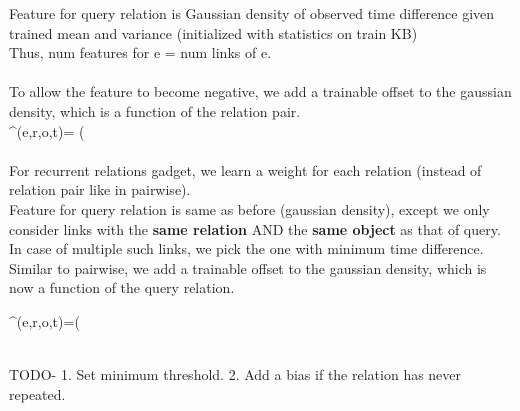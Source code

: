 \documentclass[12pt,a4paper]{article}
\begin{document}
Feature for query relation   is Gaussian density of observed time difference  given trained mean  and variance  (initialized with statistics on train KB)\\
Thus, num features for e = num links of e.\\\\
To allow the feature to become negative, we add a trainable offset to the gaussian density, which is a function of the relation pair.\\
\phi^(e,r,o,t)= \sum (\\ \\

For recurrent relations gadget, we learn a weight for each relation (instead of relation pair like in pairwise). \\
Feature for query relation is same as before (gaussian density), except we only consider links with the \textbf{same relation} AND the \textbf{same object} as that of query. In case of multiple such links, we pick the one with minimum time difference.\\
Similar to pairwise, we add a trainable offset to the gaussian density, which is now a function of the query relation.

\phi^(e,r,o,t)=(

\\
TODO-
1. Set minimum threshold.
2. Add a bias if the relation has never repeated.













\begingroup
\color{blue}
\end{document}
